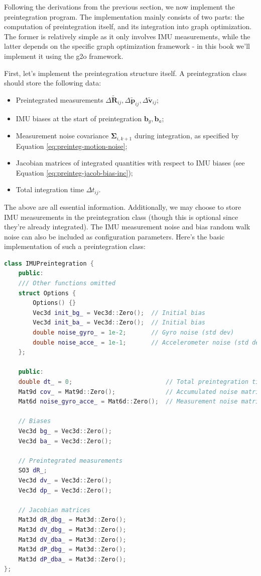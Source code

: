 Following the derivations from the previous section, we now implement the preintegration program. The implementation mainly consists of two parts: the computation of preintegration itself, and its integration into graph optimization. The former is relatively simple as it only involves IMU measurements, while the latter depends on the specific graph optimization framework - in this book we'll implement it using the g2o framework.

First, let's implement the preintegration structure itself. A preintegration class should store the following data:
\begin{itemize}
	\item Preintegrated measurements $\Delta \tilde{\bm{R}}_{ij}, \Delta \tilde{\bm{p}}_{ij}, \Delta \tilde{\bm{v}}_{ij}$;
	\item IMU biases at the start of preintegration $\bm{b}_g, \bm{b}_a$;
	\item Measurement noise covariance $\boldsymbol{\Sigma}_{i,k+1}$ during integration, as specified by Equation \eqref{eq:preinteg-motion-noise};
	\item Jacobian matrices of integrated quantities with respect to IMU biases (see Equation \eqref{eq:preinteg-jacob-bias-inc});
	\item Total integration time $\Delta t_{ij}$.
\end{itemize}

The above are all essential information. Additionally, we may choose to store IMU measurements in the preintegration class (though this is optional since they're already integrated). The IMU measurement noise and bias random walk noise can also be included as configuration parameters. Here's the basic implementation of such a preintegration class:

\begin{lstlisting}[language=c++, caption=src/ch4/imu\_preintegration.h]
class IMUPreintegration {
	public:
	/// Other functions omitted
	struct Options {
		Options() {}
		Vec3d init_bg_ = Vec3d::Zero();  // Initial bias
		Vec3d init_ba_ = Vec3d::Zero();  // Initial bias
		double noise_gyro_ = 1e-2;       // Gyro noise (std dev)
		double noise_acce_ = 1e-1;       // Accelerometer noise (std dev)
	};
	
	public:
	double dt_ = 0;                          // Total preintegration time
	Mat9d cov_ = Mat9d::Zero();              // Accumulated noise matrix
	Mat6d noise_gyro_acce_ = Mat6d::Zero();  // Measurement noise matrix
	
	// Biases
	Vec3d bg_ = Vec3d::Zero();
	Vec3d ba_ = Vec3d::Zero();
	
	// Preintegrated measurements
	SO3 dR_;
	Vec3d dv_ = Vec3d::Zero();
	Vec3d dp_ = Vec3d::Zero();
	
	// Jacobian matrices
	Mat3d dR_dbg_ = Mat3d::Zero();
	Mat3d dV_dbg_ = Mat3d::Zero();
	Mat3d dV_dba_ = Mat3d::Zero();
	Mat3d dP_dbg_ = Mat3d::Zero();
	Mat3d dP_dba_ = Mat3d::Zero();
};
\end{lstlisting}

